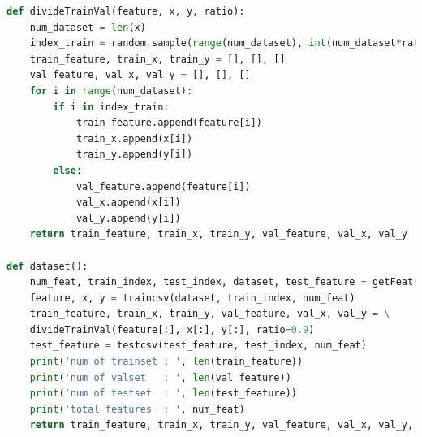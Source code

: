 \documentclass[UTF-8, a4paper, 10pt]{article}
\numberwithin{equation}{section}
\begin{document}
\begin{lstlisting}[language=python]
def divideTrainVal(feature, x, y, ratio):
    num_dataset = len(x)
    index_train = random.sample(range(num_dataset), int(num_dataset*ratio))
    train_feature, train_x, train_y = [], [], []
    val_feature, val_x, val_y = [], [], []
    for i in range(num_dataset):
        if i in index_train:
            train_feature.append(feature[i])
            train_x.append(x[i])
            train_y.append(y[i])
        else:
            val_feature.append(feature[i])
            val_x.append(x[i])
            val_y.append(y[i])
    return train_feature, train_x, train_y, val_feature, val_x, val_y

def dataset():
    num_feat, train_index, test_index, dataset, test_feature = getFeat()
    feature, x, y = traincsv(dataset, train_index, num_feat)
    train_feature, train_x, train_y, val_feature, val_x, val_y = \
    divideTrainVal(feature[:], x[:], y[:], ratio=0.9)
    test_feature = testcsv(test_feature, test_index, num_feat)
    print('num of trainset : ', len(train_feature))
    print('num of valset   : ', len(val_feature))
    print('num of testset  : ', len(test_feature))
    print('total features  : ', num_feat)
    return train_feature, train_x, train_y, val_feature, val_x, val_y, test_feature

\end{lstlisting}
\end{document}
